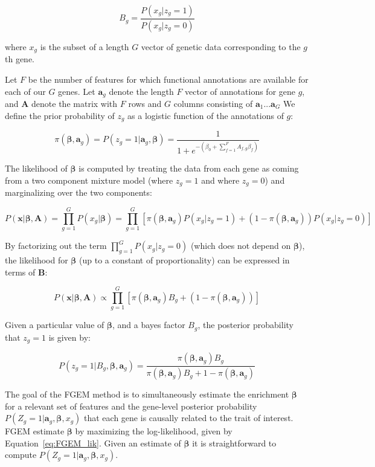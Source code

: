 $$B_g=\frac{P(x_g|z_g=1)}{P(x_g|z_g=0)}$$

where \(x_g\) is the subset of a length $G$ vector of genetic data corresponding to the $g$th gene.

Let \(F\) be the number of features for which functional annotations are available for each of our \(G\) genes.  Let \(\textbf{a}_g\) denote the length \(F\) vector of annotations for gene \(g\), and \(\textbf{A}\) denote the matrix with \(F\) rows and \(G\) 
columns consisting of \(\textbf{a}_1 ...  \textbf{a}_G\)
We define the prior probability of $z_g$ as a logistic function of the annotations of $g$:

$$\pi(\boldsymbol{\beta}, \textbf{a}_g) =  P(z_g=1|\textbf{a}_g,\boldsymbol{\beta}) =  \frac{1}{1+e^{-(\beta_{0}+\sum_{f=1}^F{A_{f,g}\beta_f})}} $$

The likelihood of \(\boldsymbol{\beta}\) is computed by treating the data from each gene as coming from a two component mixture model (where \(z_g=1\) and where \(z_g=0\)) and marginalizing over the two components:

$$ P(\textbf{x}|\boldsymbol{\beta},\textbf{A})=\prod_{g=1}^{G}P(x_g|\boldsymbol{\beta})=\prod_{g=1}^{G}[\pi(\boldsymbol{\beta},\textbf{a}_g) P(x_g|z_g=1)+(1-\pi(\boldsymbol{\beta},\textbf{a}_g))P(x_g|z_g=0)]$$

By factorizing out the term \(\prod_{g=1}^{G} P(x_g|z_g=0)\) (which does not depend on $\boldsymbol{\beta}$), the likelihood for \(\boldsymbol{\beta}\) (up to a constant of proportionality) can be expressed in terms of \(\textbf{B}\):

\begin{equation}
P(\textbf{x}|\boldsymbol{\beta},\textbf{A}) \propto \prod_{g=1}^{G}[\pi(\boldsymbol{\beta},\textbf{a}_g)B_g+(1-\pi(\boldsymbol{\beta},\textbf{a}_g))]
\label{eq:FGEM_lik}
\end{equation}


Given a particular value of \(\boldsymbol{\beta}\), and a bayes factor \(B_g\),  the posterior probability that \(z_g=1\) is given by:

$$P(z_g=1 | B_g, \boldsymbol{\beta},\textbf{a}_g) = \frac{\pi(\boldsymbol{\beta},\textbf{a}_g) B_g}{\pi(\boldsymbol{\beta} , \textbf{a}_g) B_g + 1 - \pi(\boldsymbol{\beta},\textbf{a}_g)}$$


The goal of the FGEM method is to simultaneously estimate the enrichment $\boldsymbol{\beta}$ for a relevant set of features and the gene-level posterior probability \(P(Z_g=1|\textbf{a}_g,\boldsymbol{\beta},x_g)\) that each gene is causally related to the trait of interest. FGEM estimate $\boldsymbol{\beta}$ by maximizing the log-likelihood, given by Equation~\ref{eq:FGEM_lik}. Given an estimate of $\boldsymbol{\beta}$ it is straightforward to compute
\(P(Z_g=1|\textbf{a}_g,\boldsymbol{\beta},x_g)\).


